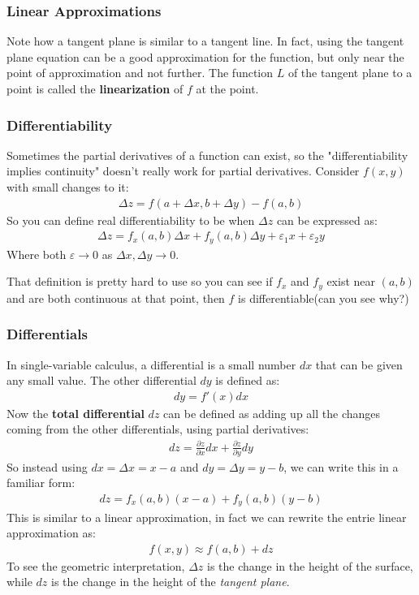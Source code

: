 \documentclass{article}
\newcommand{\p}{\partial}
\begin{document}
\subsubsection{Linear Approximations}
Note how a tangent plane is similar to a tangent line. In fact, using the tangent plane equation can be a good approximation for the function, but only near the point of approximation and not further. The function $L$ of the tangent plane to a point is called the \textbf{linearization} of $f$ at the point.
\subsubsection{Differentiability}
Sometimes the partial derivatives of a function can exist, so the "differentiability implies continuity" doesn't really work for partial derivatives. Consider $f(x,y)$ with small changes to it:
\begin{gather*}
    \Delta z = f(a + \Delta x, b + \Delta y) - f(a,b)
\end{gather*}
So you can define real differentiability to be when $\Delta z$ can be expressed as:
\begin{gather*}
    \Delta z = f_x(a,b)\Delta x + f_y(a,b) \Delta y + \varepsilon_1 x + \varepsilon_2 y
\end{gather*}
Where both $\varepsilon \to 0$ as $\Delta x, \Delta y \to 0$.

That definition is pretty hard to use so you can see if $f_x$ and $f_y$ exist near $(a,b)$ and are both continuous at that point, then $f$ is differentiable(can you see why?)
\subsubsection{Differentials}
In single-variable calculus, a differential is a small number $dx$ that can be given any small value. The other differential $dy$ is defined as:
\begin{gather*}
    dy = f'(x) dx
\end{gather*}
Now the \textbf{total differential} $dz$ can be defined as adding up all the changes coming from the other differentials, using partial derivatives:
\begin{gather*}
    dz = \frac{\p z}{\p x}dx + \frac{\p z}{\p y}dy
\end{gather*}
So instead using $dx = \Delta x = x - a$ and $dy = \Delta y = y - b$, we can write this in a familiar form:
\begin{gather*}
    dz = f_x(a,b)(x-a) + f_y(a,b)(y-b)
\end{gather*}
This is similar to a linear approximation, in fact we can rewrite the entrie linear approximation as:
\begin{gather*}
    f(x,y) \approx f(a,b) + dz
\end{gather*}
To see the geometric interpretation, $\Delta z$ is the change in the height of the surface, while $dz$ is the change in the height of the \textit{tangent plane}.
\end{document}
